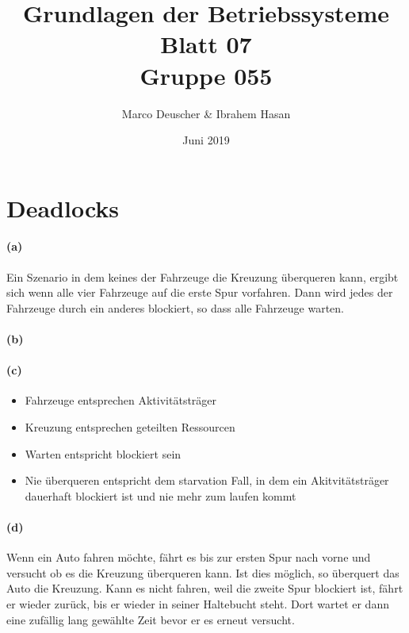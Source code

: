 \documentclass[a4paper]{article}
\title{Grundlagen der Betriebssysteme\\ Blatt 07 \\ Gruppe 055}
\author{Marco Deuscher & Ibrahem Hasan}
\date{Juni 2019}
\begin{document}
\maketitle

\section{Deadlocks}
\paragraph{(a)}
Ein Szenario in dem keines der Fahrzeuge die Kreuzung überqueren kann, ergibt sich wenn alle vier Fahrzeuge auf die erste Spur vorfahren. Dann wird jedes der Fahrzeuge durch ein anderes blockiert, so dass alle Fahrzeuge warten.\\

\paragraph{(b)}

\paragraph{(c)}
\begin{itemize}
    \item Fahrzeuge entsprechen Aktivitätsträger
    \item Kreuzung entsprechen geteilten Ressourcen
    \item Warten entspricht blockiert sein
    \item Nie überqueren entspricht dem starvation Fall, in dem ein Akitvitätsträger dauerhaft blockiert ist und nie mehr zum laufen kommt
\end{itemize}

\paragraph{(d)}
Wenn ein Auto fahren möchte, fährt es bis zur ersten Spur nach vorne und versucht ob es die Kreuzung überqueren kann. Ist dies möglich, so überquert das Auto die Kreuzung. Kann es nicht fahren, weil die zweite Spur blockiert ist, fährt er wieder zurück, bis er wieder in seiner Haltebucht steht. Dort wartet er dann eine zufällig lang gewählte Zeit bevor er es erneut versucht.
\end{document}
